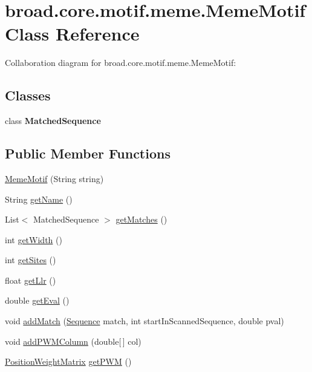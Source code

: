 \hypertarget{classbroad_1_1core_1_1motif_1_1meme_1_1_meme_motif}{\section{broad.\+core.\+motif.\+meme.\+Meme\+Motif Class Reference}
\label{classbroad_1_1core_1_1motif_1_1meme_1_1_meme_motif}
}


Collaboration diagram for broad.\+core.\+motif.\+meme.\+Meme\+Motif\+:
\subsection*{Classes}
\begin{DoxyCompactItemize}
\item 
class {\bfseries Matched\+Sequence}
\end{DoxyCompactItemize}
\subsection*{Public Member Functions}
\begin{DoxyCompactItemize}
\item 
\hyperlink{classbroad_1_1core_1_1motif_1_1meme_1_1_meme_motif_a20a7df93fe14459e2764f7d60a135453}{Meme\+Motif} (String string)
\item 
String \hyperlink{classbroad_1_1core_1_1motif_1_1meme_1_1_meme_motif_aba49196c19dea4235afa8d3b226dcbc8}{get\+Name} ()
\item 
List$<$ Matched\+Sequence $>$ \hyperlink{classbroad_1_1core_1_1motif_1_1meme_1_1_meme_motif_a57076b3995d8d3ce052a9db400bdc663}{get\+Matches} ()
\item 
int \hyperlink{classbroad_1_1core_1_1motif_1_1meme_1_1_meme_motif_a172b6ebd50e0a9b55be788f21f006cd4}{get\+Width} ()
\item 
int \hyperlink{classbroad_1_1core_1_1motif_1_1meme_1_1_meme_motif_a673b187a0caaae88d18e60e7ccd6c04d}{get\+Sites} ()
\item 
float \hyperlink{classbroad_1_1core_1_1motif_1_1meme_1_1_meme_motif_a8cbf5b9f393210e55326d9c8b1ed87d2}{get\+Llr} ()
\item 
double \hyperlink{classbroad_1_1core_1_1motif_1_1meme_1_1_meme_motif_a9cb970391847d2a40e96b19fdeeec93c}{get\+Eval} ()
\item 
void \hyperlink{classbroad_1_1core_1_1motif_1_1meme_1_1_meme_motif_ad9cae0f7fc45d67ce0f0e978acebc21c}{add\+Match} (\hyperlink{classjaligner_1_1_sequence}{Sequence} match, int start\+In\+Scanned\+Sequence, double pval)
\item 
void \hyperlink{classbroad_1_1core_1_1motif_1_1meme_1_1_meme_motif_a901c3a071f7e65f7998d8b99a5dd2206}{add\+P\+W\+M\+Column} (double\mbox{[}$\,$\mbox{]} col)
\item 
\hyperlink{classbroad_1_1core_1_1motif_1_1_position_weight_matrix}{Position\+Weight\+Matrix} \hyperlink{classbroad_1_1core_1_1motif_1_1meme_1_1_meme_motif_a6538d8c841ba837042a0747c1b49ee7d}{get\+P\+W\+M} ()
\end{DoxyCompactItemize}


